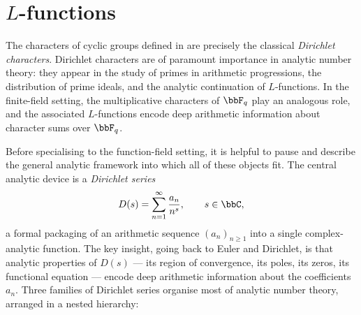 \section{\texorpdfstring{$L$}{L}-functions}\label{l-functions}
The characters of cyclic groups defined in  are precisely the classical \emph{Dirichlet characters}. Dirichlet characters are of paramount importance in analytic number theory: they appear in the study of primes in arithmetic progressions, the distribution of prime ideals, and the analytic continuation of $L$-functions. In the finite-field setting, the multiplicative characters of $\bbF_q$ play an analogous role, and the associated $L$-functions encode deep arithmetic information about character sums over $\bbF_q$.

Before specialising to the function-field setting, it is helpful to pause and describe the general analytic framework into which all of these objects fit. The central analytic device is a \emph{Dirichlet series}
$$D(s)=\sum_{n=1}^{\infty}\frac{a_n}{n^s}, \qquad s\in\bbC,$$
a formal packaging of an arithmetic sequence $(a_n)_{n\geq 1}$ into a single complex-analytic function. The key insight, going back to Euler and Dirichlet, is that analytic properties of $D(s)$ --- its region of convergence, its poles, its zeros, its functional equation --- encode deep arithmetic information about the coefficients $a_n$. Three families of Dirichlet series organise most of analytic number theory, arranged in a nested hierarchy:

